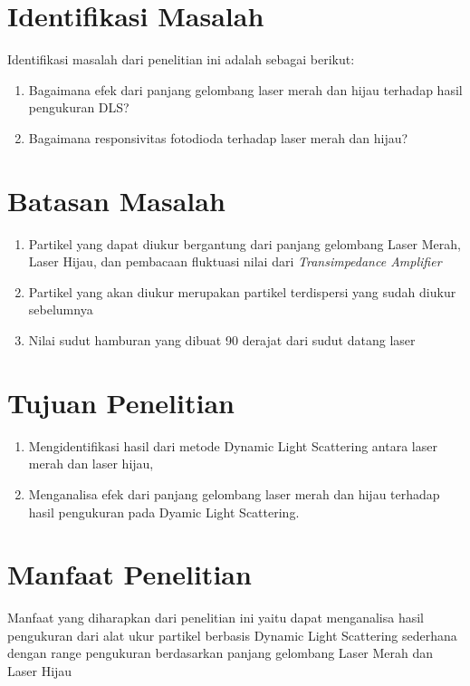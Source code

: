 \section{Identifikasi Masalah}
Identifikasi masalah dari penelitian ini adalah sebagai berikut:
\begin{enumerate}
  \item Bagaimana efek dari panjang gelombang laser merah dan hijau terhadap hasil pengukuran DLS?
  \item Bagaimana responsivitas fotodioda terhadap laser merah dan hijau?
\end{enumerate}

\section{Batasan Masalah}
\begin{enumerate}
    \item Partikel yang dapat diukur bergantung dari panjang gelombang Laser Merah, Laser Hijau,
    dan pembacaan fluktuasi nilai dari \textit{Transimpedance Amplifier}
    \item Partikel yang akan diukur merupakan partikel terdispersi yang sudah diukur sebelumnya
    \item Nilai sudut hamburan yang dibuat 90 derajat dari sudut datang laser
\end{enumerate}

\section{Tujuan Penelitian}
\begin{enumerate}
  \item Mengidentifikasi hasil dari metode Dynamic Light Scattering antara laser merah dan laser hijau,
  \item Menganalisa efek dari panjang gelombang laser merah dan hijau terhadap hasil pengukuran pada Dyamic Light Scattering.
\end{enumerate}

\section{Manfaat Penelitian}
Manfaat yang diharapkan dari penelitian ini yaitu dapat menganalisa hasil pengukuran dari alat ukur
partikel berbasis Dynamic Light Scattering sederhana dengan range pengukuran berdasarkan panjang
gelombang Laser Merah dan Laser Hijau
